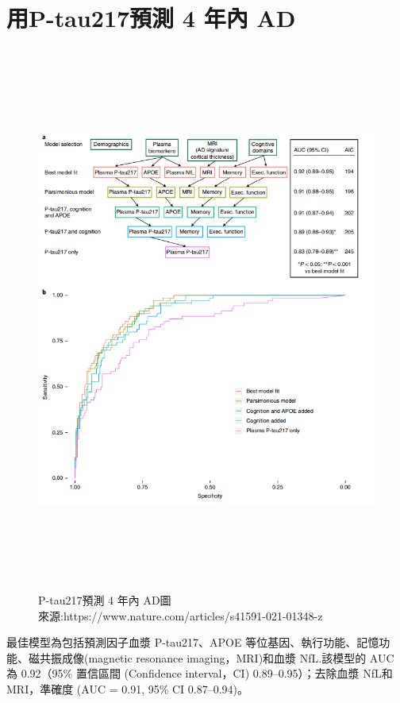 \section{用P-tau217預測 4 年內 AD }
\begin{figure}[H]
	\centerline{\includegraphics[height=18cm]{pic/AD217.PNG}}
	\caption{P-tau217預測 4 年內 AD圖\\來源:https://www.nature.com/articles/s41591-021-01348-z}
	\label{fig:AD217}
\end{figure}
最佳模型為包括預測因子血漿 P-tau217、APOE 等位基因、執行功能、記憶功能、磁共振成像(magnetic resonance imaging，MRI)和血漿 NfL.該模型的 AUC 為 0.92（95\% 置信區間 (Confidence interval，CI) 0.89–0.95）；去除血漿 NfL和MRI，準確度 (AUC = 0.91, 95\% CI 0.87–0.94)。


